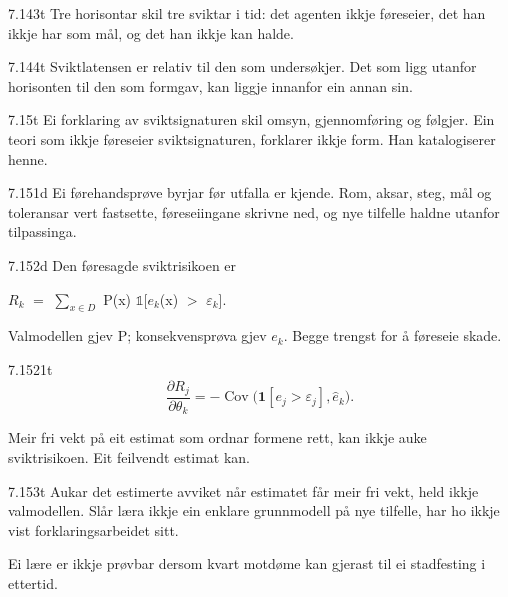 \begin{formproposition}{7.143}{t}
Tre horisontar skil tre sviktar i tid: det agenten ikkje føreseier, det han ikkje har som mål, og det han ikkje kan halde.
\end{formproposition}

\begin{formproposition}{7.144}{t}
Sviktlatensen er relativ til den som undersøkjer. Det som ligg utanfor horisonten til den som formgav, kan liggje innanfor ein annan sin.
\end{formproposition}

\begin{formproposition}{7.15}{t}
Ei forklaring av sviktsignaturen skil omsyn, gjennomføring og følgjer. Ein teori som ikkje føreseier sviktsignaturen, forklarer ikkje form. Han katalogiserer henne.
\end{formproposition}

\begin{formproposition}{7.151}{d}
Ei førehandsprøve byrjar før utfalla er kjende. Rom, aksar, steg, mål og toleransar vert fastsette, føreseiingane skrivne ned, og nye tilfelle haldne utanfor tilpassinga.
\end{formproposition}

\begin{formproposition}{7.152}{d}
Den føresagde sviktrisikoen er

\(R_{k}\) \(=\) \(∑_{x∈D}\) P(x) \(𝟙\)[\(e_{k}\)(x) \(>\) \(ε_{k}\)].

Valmodellen gjev P; konsekvensprøva gjev \(e_{k}\). Begge trengst for å føreseie skade.
\end{formproposition}

\begin{formproposition}{7.1521}{t}
\[
\frac{\partial R_j}{\partial\theta_k}=-\operatorname{Cov}\bigl(\mathbf 1[e_j>\varepsilon_j],\hat e_k\bigr).
\]

Meir fri vekt på eit estimat som ordnar formene rett, kan ikkje auke sviktrisikoen. Eit feilvendt estimat kan.
\end{formproposition}

\begin{formproposition}{7.153}{t}
Aukar det estimerte avviket når estimatet får meir fri vekt, held ikkje valmodellen. Slår læra ikkje ein enklare grunnmodell på nye tilfelle, har ho ikkje vist forklaringsarbeidet sitt.

Ei lære er ikkje prøvbar dersom kvart motdøme kan gjerast til ei stadfesting i ettertid.
\end{formproposition}


